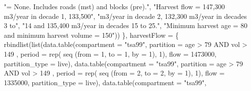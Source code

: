 \documentclass[
  letterpaper,
  DIV=11,
  numbers=noendperiod]{scrreprt}
\newenvironment{Shaded}{\begin{snugshade}}{\end{snugshade}}
\newcommand{\AttributeTok}[1]{\textcolor[rgb]{0.40,0.45,0.13}{#1}}
\newcommand{\DecValTok}[1]{\textcolor[rgb]{0.68,0.00,0.00}{#1}}
\newcommand{\FunctionTok}[1]{\textcolor[rgb]{0.28,0.35,0.67}{#1}}
\newcommand{\NormalTok}[1]{\textcolor[rgb]{0.00,0.23,0.31}{#1}}
\newcommand{\StringTok}[1]{\textcolor[rgb]{0.13,0.47,0.30}{#1}}
\begin{document}
\begin{Shaded}
\begin{Highlighting}[]
                                   \StringTok{"= None. Includes roads (mst) and blocks (pre)."}\NormalTok{,}
                                   \StringTok{"Harvest flow = 147,300 m3/year in decade 1, 133,500"}\NormalTok{,}
                                   \StringTok{"m3/year in decade 2, 132,300 m3/year in decades 3 to"}\NormalTok{,}
                                   \StringTok{"14 and 135,400 m3/year in decades 15 to 25."}\NormalTok{,}
                                   \StringTok{"Minimum harvest age = 80 and minimum harvest volume = 150"}\NormalTok{))}
\NormalTok{  \},}
  \AttributeTok{harvestFlow =}\NormalTok{ \{}
    \FunctionTok{rbindlist}\NormalTok{(}\FunctionTok{list}\NormalTok{(}\FunctionTok{data.table}\NormalTok{(}\AttributeTok{compartment =} \StringTok{"tsa99"}\NormalTok{,}
                              \AttributeTok{partition =} \StringTok{\textquotesingle{} age \textgreater{} 79 AND vol \textgreater{} 149 \textquotesingle{}}\NormalTok{, }
                              \AttributeTok{period =} \FunctionTok{rep}\NormalTok{( }\FunctionTok{seq}\NormalTok{ (}\AttributeTok{from =} \DecValTok{1}\NormalTok{,}
                                                 \AttributeTok{to =} \DecValTok{1}\NormalTok{, }
                                                 \AttributeTok{by =} \DecValTok{1}\NormalTok{),}
                                            \DecValTok{1}\NormalTok{), }
                              \AttributeTok{flow =} \DecValTok{1473000}\NormalTok{, }
                              \AttributeTok{partition\_type =} \StringTok{\textquotesingle{}live\textquotesingle{}}\NormalTok{),}
                   \FunctionTok{data.table}\NormalTok{(}\AttributeTok{compartment =} \StringTok{"tsa99"}\NormalTok{,}
                              \AttributeTok{partition =} \StringTok{\textquotesingle{} age \textgreater{} 79 AND vol \textgreater{} 149 \textquotesingle{}}\NormalTok{, }
                              \AttributeTok{period =} \FunctionTok{rep}\NormalTok{( }\FunctionTok{seq}\NormalTok{ (}\AttributeTok{from =} \DecValTok{2}\NormalTok{,}
                                                 \AttributeTok{to =} \DecValTok{2}\NormalTok{, }
                                                 \AttributeTok{by =} \DecValTok{1}\NormalTok{),}
                                            \DecValTok{1}\NormalTok{), }
                              \AttributeTok{flow =} \DecValTok{1335000}\NormalTok{, }
                              \AttributeTok{partition\_type =} \StringTok{\textquotesingle{}live\textquotesingle{}}\NormalTok{),}
                   \FunctionTok{data.table}\NormalTok{(}\AttributeTok{compartment =} \StringTok{"tsa99"}\NormalTok{,}

\end{Highlighting}
\end{Shaded}
\end{document}
